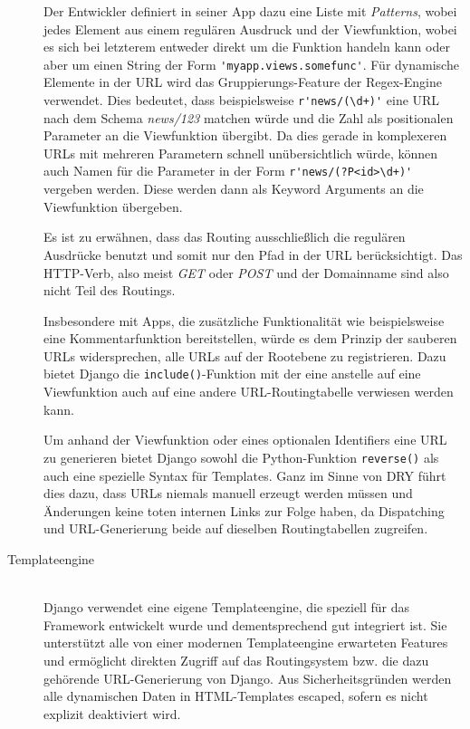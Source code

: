 \begin{description}
Der Entwickler definiert in seiner App dazu eine Liste mit \emph{Patterns}, wobei jedes Element aus
einem regulären Ausdruck und der Viewfunktion, wobei es sich bei letzterem entweder direkt um die
Funktion handeln kann oder aber um einen String der Form \lstinline{'myapp.views.somefunc'}. Für
dynamische Elemente in der URL wird das Gruppierungs-Feature der Regex-Engine verwendet. Dies
bedeutet, dass beispielsweise \lstinline{r'news/(\d+)'} eine URL nach dem Schema \emph{news/123}
matchen würde und die Zahl als positionalen Parameter an die Viewfunktion übergibt. Da dies gerade
in komplexeren URLs mit mehreren Parametern schnell unübersichtlich würde, können auch Namen für die
Parameter in der Form \lstinline{r'news/(?P<id>\d+)'} vergeben werden. Diese werden dann als Keyword
Arguments an die Viewfunktion übergeben.

Es ist zu erwähnen, dass das Routing ausschließlich die regulären Ausdrücke benutzt und somit nur
den Pfad in der URL berücksichtigt. Das HTTP-Verb, also meist \emph{GET} oder \emph{POST} und der
Domainname sind also nicht Teil des Routings.

Insbesondere mit Apps, die zusätzliche Funktionalität wie beispielsweise eine Kommentarfunktion
bereitstellen, würde es dem Prinzip der sauberen URLs widersprechen, alle URLs auf der Rootebene zu
registrieren. Dazu bietet Django die \lstinline{include()}-Funktion mit der eine anstelle auf eine
Viewfunktion auch auf eine andere URL-Routingtabelle verwiesen werden kann.

Um anhand der Viewfunktion oder eines optionalen Identifiers eine URL zu generieren bietet Django
sowohl die Python-Funktion \lstinline{reverse()} als auch eine spezielle Syntax für Templates. Ganz
im Sinne von DRY führt dies dazu, dass URLs niemals manuell erzeugt werden müssen und Änderungen
keine toten internen Links zur Folge haben, da Dispatching und URL-Generierung beide auf dieselben
Routingtabellen zugreifen.


\item[Templateengine] \hfill \\
Django verwendet eine eigene Templateengine, die speziell für das Framework entwickelt wurde und
dementsprechend gut integriert ist. Sie unterstützt alle von einer modernen Templateengine
erwarteten Features und ermöglicht direkten Zugriff auf das Routingsystem bzw. die dazu gehörende
URL-Generierung von Django. Aus Sicherheitsgründen werden alle dynamischen Daten in HTML-Templates
escaped, sofern es nicht explizit deaktiviert wird.


\end{description}
